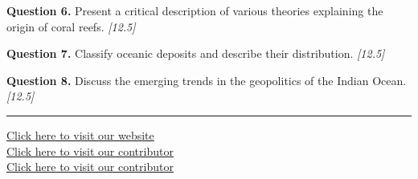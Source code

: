 \documentclass[11pt,a4paper]{article}
\newcommand{\pts}[1]{\hfill   \textit{[#1]}}
\begin{document}
\noindent   \textbf{Question 6.} Present a critical description of various theories explaining the origin of coral reefs. \pts{12.5}

\medskip


\noindent   \textbf{Question 7.} Classify oceanic deposits and describe their distribution. \pts{12.5}

\medskip


\noindent   \textbf{Question 8.} Discuss the emerging trends in the geopolitics of the Indian Ocean. \pts{12.5}

\vfill\rule{\linewidth}{0.4pt}

\begin{center}\small
\href{https://bhu-exam.vercel.app/}{Click here to visit our website}\\[4pt]
\href{https://me-aryan.vercel.app/}{Click here to visit our contributor}\\[4pt]
\href{https://quashan-me.vercel.app/}{Click here to visit our contributor}
\end{center}
\end{document}
